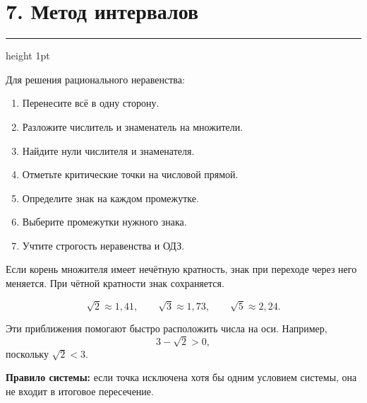 \documentclass[a4paper,12pt]{article}
\newcommand{\important}[1]{\textcolor{darkaccent}{\textbf{#1}}}
\newcommand{\sectionrule}{%
  \vspace{-2mm}
  {\color{lightaccent}\hrule height 1pt}
  \vspace{3mm}
}
\begin{document}

\section*{\textcolor{darkaccent}{7. Метод интервалов}}
\sectionrule

Для решения рационального неравенства:

\begin{enumerate}
  \item Перенесите всё в одну сторону.
  \item Разложите числитель и знаменатель на множители.
  \item Найдите нули числителя и знаменателя.
  \item Отметьте критические точки на числовой прямой.
  \item Определите знак на каждом промежутке.
  \item Выберите промежутки нужного знака.
  \item Учтите строгость неравенства и ОДЗ.
\end{enumerate}

Если корень множителя имеет нечётную кратность, знак при переходе
через него меняется. При чётной кратности знак сохраняется.

\[
\sqrt2\approx1{,}41,\qquad
\sqrt3\approx1{,}73,\qquad
\sqrt5\approx2{,}24.
\]

Эти приближения помогают быстро расположить числа на оси. Например,
\[
3-\sqrt2>0,
\]
поскольку \(\sqrt2<3\).

\begin{center}
\end{center}

\important{Правило системы:} если точка исключена хотя бы одним
условием системы, она не входит в итоговое пересечение.
\end{document}
